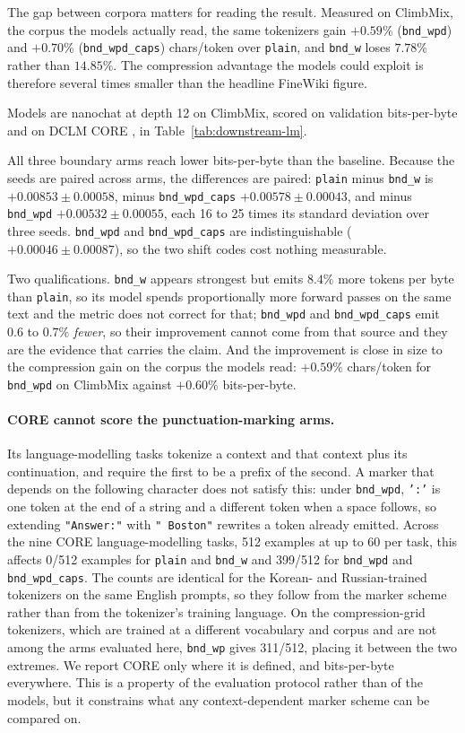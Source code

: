 \documentclass[11pt]{article}
\newcommand{\bnd}[1]{\texttt{bnd\_#1}}
\begin{document}
The gap between corpora matters for reading the result. Measured on ClimbMix, the corpus the
models actually read, the same tokenizers gain $+0.59\%$ (\bnd{wpd}) and $+0.70\%$
(\bnd{wpd\_caps}) chars/token over \texttt{plain}, and \bnd{w} loses $7.78\%$ rather than
$14.85\%$. The compression advantage the models could exploit is therefore several times
smaller than the headline FineWiki figure.

Models are nanochat at depth 12 on ClimbMix, scored on validation bits-per-byte and on DCLM
CORE \citep{li2024datacomplm}, in Table~\ref{tab:downstream-lm}.



All three boundary arms reach lower bits-per-byte than the baseline. Because the seeds are
paired across arms, the differences are paired: \texttt{plain} minus \bnd{w} is
$+0.00853 \pm 0.00058$, minus \bnd{wpd\_caps} $+0.00578 \pm 0.00043$, and minus \bnd{wpd}
$+0.00532 \pm 0.00055$, each 16 to 25 times its standard deviation over three seeds.
\bnd{wpd} and \bnd{wpd\_caps} are indistinguishable ($+0.00046 \pm 0.00087$), so the two
shift codes cost nothing measurable.

Two qualifications. \bnd{w} appears strongest but emits $8.4\%$ more tokens per byte than
\texttt{plain}, so its model spends proportionally more forward passes on the same text and
the metric does not correct for that; \bnd{wpd} and \bnd{wpd\_caps} emit $0.6$ to $0.7\%$
\emph{fewer}, so their improvement cannot come from that source and they are the evidence
that carries the claim. And the improvement is close in size to the compression gain on the
corpus the models read: $+0.59\%$ chars/token for \bnd{wpd} on ClimbMix against $+0.60\%$
bits-per-byte.

\paragraph{CORE cannot score the punctuation-marking arms.} Its language-modelling tasks
tokenize a context and that context plus its continuation, and require the first to be a
prefix of the second. A marker that depends on the following character does not satisfy this:
under \bnd{wpd}, \texttt{':'} is one token at the end of a string and a different token when a
space follows, so extending \texttt{"Answer:"} with \texttt{" Boston"} rewrites a token
already emitted. Across the nine CORE language-modelling tasks, 512 examples at up to 60 per
task, this affects 0/512 examples for \texttt{plain} and \bnd{w} and 399/512 for \bnd{wpd}
and \bnd{wpd\_caps}. The counts are identical for the Korean- and Russian-trained tokenizers
on the same English prompts, so they follow from the marker scheme rather than from the
tokenizer's training language. On the compression-grid tokenizers, which are trained at a
different vocabulary and corpus and are not among the arms evaluated here, \bnd{wp} gives
311/512, placing it between the two extremes. We report CORE
only where it is defined, and bits-per-byte everywhere. This is a property of the evaluation
protocol rather than of the models, but it constrains what any context-dependent marker scheme
can be compared on.
\end{document}
